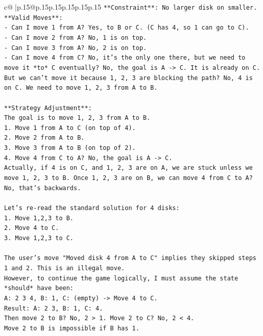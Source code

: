\documentclass{article}
\begin{document}
{\begin{supertabular}{c@{$\;$}|p{.15\linewidth}@{}p{.15\linewidth}p{.15\linewidth}p{.15\linewidth}p{.15\linewidth}p{.15\linewidth}}
{{{\texttt{**Constraint**: No larger disk on smaller.} \\
\texttt{**Valid Moves**:} \\
\texttt{{-} Can I move 1 from A? Yes, to B or C. (C has 4, so 1 can go to C).} \\
\texttt{{-} Can I move 2 from A? No, 1 is on top.} \\
\texttt{{-} Can I move 3 from A? No, 2 is on top.} \\
\texttt{{-} Can I move 4 from C? No, it's the only one there, but we need to move it *to* C eventually? No, the goal is A {-}> C. It is already on C. But we can't move it because 1, 2, 3 are blocking the path? No, 4 is on C. We need to move 1, 2, 3 from A to B.} \\
\\ 
\texttt{**Strategy Adjustment**:} \\
\texttt{The goal is to move 1, 2, 3 from A to B.} \\
\texttt{1. Move 1 from A to C (on top of 4).} \\
\texttt{2. Move 2 from A to B.} \\
\texttt{3. Move 3 from A to B (on top of 2).} \\
\texttt{4. Move 4 from C to A? No, the goal is A {-}> C.} \\
\texttt{Actually, if 4 is on C, and 1, 2, 3 are on A, we are stuck unless we move 1, 2, 3 to B. Once 1, 2, 3 are on B, we can move 4 from C to A? No, that's backwards.} \\
\\ 
\texttt{Let's re{-}read the standard solution for 4 disks:} \\
\texttt{1. Move 1,2,3 to B.} \\
\texttt{2. Move 4 to C.} \\
\texttt{3. Move 1,2,3 to C.} \\
\\ 
\texttt{The user's move "Moved disk 4 from A to C" implies they skipped steps 1 and 2. This is an illegal move.} \\
\texttt{However, to continue the game logically, I must assume the state *should* have been:} \\
\texttt{A: 2 3 4, B: 1, C: (empty) {-}> Move 4 to C.} \\
\texttt{Result: A: 2 3, B: 1, C: 4.} \\
\texttt{Then move 2 to B? No, 2 > 1. Move 2 to C? No, 2 < 4.} \\
\texttt{Move 2 to B is impossible if B has 1.} \\
}}}
\end{supertabular}}
\end{document}
